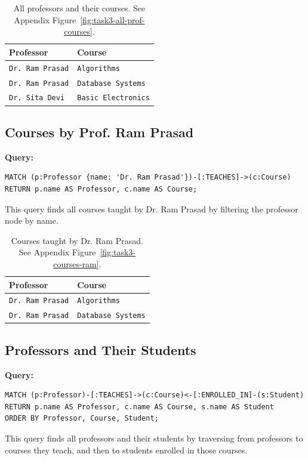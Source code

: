 \begin{table}[H]
  \centering
  \caption{All professors and their courses. See Appendix Figure~\ref{fig:task3-all-prof-courses}.}
  \begin{tabular}{ll}
    \textbf{Professor} & \textbf{Course} \\
    \hline
    \texttt{Dr. Ram Prasad} & \texttt{Algorithms} \\
    \texttt{Dr. Ram Prasad} & \texttt{Database Systems} \\
    \texttt{Dr. Sita Devi} & \texttt{Basic Electronics} \\
  \end{tabular}
\end{table}

\subsection{Courses by Prof. Ram Prasad}
\textbf{Query:}
\begin{verbatim}
MATCH (p:Professor {name: 'Dr. Ram Prasad'})-[:TEACHES]->(c:Course)
RETURN p.name AS Professor, c.name AS Course;
\end{verbatim}
This query finds all courses taught by Dr. Ram Prasad by filtering the professor node by name.

\begin{table}[H]
  \centering
  \caption{Courses taught by Dr. Ram Prasad. See Appendix Figure~\ref{fig:task3-courses-ram}.}
  \begin{tabular}{ll}
    \textbf{Professor} & \textbf{Course} \\
    \hline
    \texttt{Dr. Ram Prasad} & \texttt{Algorithms} \\
    \texttt{Dr. Ram Prasad} & \texttt{Database Systems} \\
  \end{tabular}
\end{table}

\subsection{Professors and Their Students}
\textbf{Query:}
\begin{verbatim}
MATCH (p:Professor)-[:TEACHES]->(c:Course)<-[:ENROLLED_IN]-(s:Student)
RETURN p.name AS Professor, c.name AS Course, s.name AS Student
ORDER BY Professor, Course, Student;
\end{verbatim}
This query finds all professors and their students by traversing from professors to courses they teach, and then to students enrolled in those courses.

